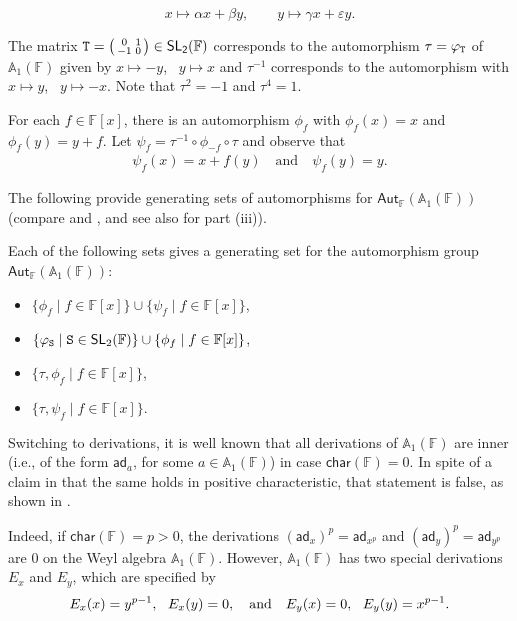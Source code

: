 \documentclass{commat}
\newcommand\q{\quad}
\newcommand{\FF}{\mathbb{F}}
\newcommand{\wa}[1][1]{\mathbb{A}_{#1}}
\newcommand\chara{\mathsf {char}}
\newcommand\aut[1][\FF]{ \mathsf{Aut}_{#1}}
\newcommand\ad{\mathsf{ad}}
\begin{document}
\begin{equation*}   x  \mapsto  \alpha x + \beta y,   \qquad    y \mapsto   \gamma x + \varepsilon y. \end{equation*}

The matrix $\tt T= \left( \begin{smallmatrix} 0 & 1 \\  -1 & 0 \end{smallmatrix} \right) \in \mathsf{SL_2(\FF)}$
corresponds to the automorphism $\tau = \varphi_{\tt T}$  of $\wa(\FF)$ given by  $x \mapsto -y$, \, $y \mapsto x$ 
and $\tau^{-1}$ corresponds to the automorphism with $x \mapsto y$, \, $y \mapsto -x$.   Note that $\tau^2 = -1$ and $\tau^4 = 1$.    


For each $f \in \FF[x]$,  there is an automorphism $\phi_f$ with $\phi_f(x) = x$ and
$\phi_f(y) = y+f$. Let $\psi_f = \tau^{-1} \circ  \phi_{-f} \circ \tau$ and observe that
\begin{align*} \psi_f(x) = x + f(y)\q \text{and}\q
	\psi_f(y) =  y. \end{align*}

The following provide generating sets of automorphisms for $\aut(\wa(\FF))$ (compare 
\cite {ML84} and \cite{tS87},  and see also \cite{KA11} for part (iii)).

\begin{theorem}\label{T:autgens}   Each of the following sets  gives a generating set for the automorphism
	group $\aut(\wa(\FF))$:
	\begin{itemize} 
		\item[{\rm (i)}] $\{\phi_f  \mid f \in \FF[x]\} \cup \{\psi_f \mid f \in \FF[x]\}$,
		\item[{\rm (ii)}]  $\{\varphi_{\tt S} \mid {\tt S} \in \mathsf{SL}_2(\FF) \}  \cup
		\{\phi_f  \mid f \in \FF[x]\}$,
		\item[{\rm (iii)}] $\{\tau, \phi_f  \mid f \in \FF[x]\}$,
		\item[{\rm (iv)}] $\{\tau, \psi_f  \mid f \in \FF[x]\}$.
	\end{itemize}
\end{theorem} 

Switching to derivations, it is well known that all derivations of $\wa(\FF)$ are inner (i.e., of the form $\ad_a$, for some $a\in\wa(\FF)$) in case $\chara(\FF) = 0$. In spite of a claim in \cite[Cor.]{pR73} that the same holds in positive characteristic, that statement is false, as shown in \cite{BLO15ja}.

Indeed, if $\chara(\FF)=p > 0$, the derivations $ (\ad_x)^p =\ad_{x^p}$ and $(\ad_y)^p =\ad_{y^p}$ are $0$ on the Weyl algebra  $\wa(\FF)$.   However, $\wa(\FF)$ has two special derivations
$E_x$ and $E_y$,  which are specified by
\begin{equation*} E_x(x) = y^{p-1},  \ \   E_x(y) = 0, \quad \hbox{and} \quad   E_y(x) = 0, \ \ E_y(y) = x^{p-1}.
\end{equation*}
\end{document}
